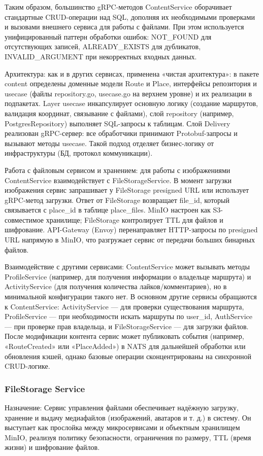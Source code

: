 Таким образом, большинство gRPC-методов ContentService оборачивает стандартные CRUD-операции над SQL, дополняя их необходимыми проверками и вызовами внешнего сервиса для работы с файлами. При этом используется унифицированный паттерн обработки ошибок: NOT\_FOUND для отсутствующих записей, ALREADY\_EXISTS для дубликатов, INVALID\_ARGUMENT при некорректных входных данных.

Архитектура: как и в других сервисах, применена «чистая архитектура»: в пакете content определены доменные модели Route и Place, интерфейсы репозитория и usecase (файлы repository.go, usecase.go на верхнем уровне) и их реализации в подпакетах. Layer usecase инкапсулирует основную логику (создание маршрутов, валидация координат, связывание с файлами), слой repository (например, PostgresRepository) выполняет SQL-запросы к таблицам. Слой Delivery реализован gRPC-сервер: все обработчики принимают Protobuf-запросы и вызывают методы usecase. Такой подход отделяет бизнес-логику от инфраструктуры (БД, протокол коммуникации).

Работа с файловым сервисом и хранением: для работы с изображениями ContentService взаимодействует с FileStorageService. В момент загрузки изображения сервис запрашивает у FileStorage presigned URL или использует gRPC-метод загрузки. Ответ от FileStorage возвращает file\_id, который связывается с place\_id в таблице place\_files. MinIO настроен как S3-совместимое хранилище; FileStorage контролирует TTL для файлов и шифрование. API-Gateway (Envoy) перенаправляет HTTP-запросы по presigned URL напрямую в MinIO, что разгружает сервис от передачи больших бинарных файлов.

Взаимодействие с другими сервисами: ContentService может вызывать методы ProfileService (например, для получения информации о владельце маршрута) и ActivityService (для получения количества лайков/комментариев), но в минимальной конфигурации такого нет. В основном другие сервисы обращаются к ContentService: ActivityService — для проверки существования маршрута, ProfileService — при необходимости искать маршруты по user\_id, AuthService — при проверке прав владельца, и FileStorageService — для загрузки файлов. После модификации контента сервис может публиковать события (например, «RouteCreated» или «PlaceAdded») в NATS для дальнейшей обработки или обновления кэшей, однако базовые операции сконцентрированы на синхронной CRUD-логике.

\subsubsection*{FileStorage Service}
Назначение: Сервис управления файлами обеспечивает надёжную загрузку, хранение и выдачу медиафайлов (изображений, аватаров и т. д.) в систему. Он выступает как прослойка между микросервисами и объектным хранилищем MinIO, реализуя политику безопасности, ограничения по размеру, TTL (время жизни) и шифрование файлов.

